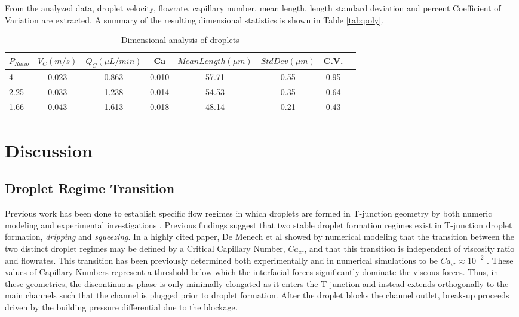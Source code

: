\clearpage

From the analyzed data, droplet velocity, flowrate, capillary number, mean length, length standard deviation and percent Coefficient of Variation are extracted. A summary of the resulting dimensional statistics is shown in Table \vref{tab:poly}.

\qquad

\begin{table}[H]
\begin{tabular}{l*{6}{c}r}
$ P_{Ratio} $ & $ V_C  (m/s) $ &  $ Q_C ( \mu  L/min) $ & Ca & $ Mean Length( \mu m )$ & $ StdDev( \mu m) $ & C.V. \\
\hline
4 & 0.023 & 0.863 & 0.010 & 57.71 & 0.55 & 0.95 \\
2.25 & 0.033 & 1.238 & 0.014 & 54.53 & 0.35 &  0.64 \\
1.66 & 0.043 & 1.613 & 0.018 & 48.14 & 0.21 &  0.43 \\
\end{tabular}
\caption[Droplet Polydispersity]{Dimensional analysis of droplets}
\label{tab:poly} 
\end{table}


\clearpage


\section{Discussion}
\subsection{Droplet Regime Transition}

Previous work has been done to establish specific flow regimes in which droplets are formed in T-junction geometry by both numeric modeling and experimental investigations \cite{Abate2012a, DeMenech2008, Garstecki2006}. Previous findings suggest that two stable droplet formation regimes exist in T-junction droplet formation, \emph{dripping} and \emph{squeezing}. In a highly cited paper, De Menech et al showed by numerical modeling that the transition between the two distinct droplet regimes may be defined by a Critical Capillary Number, $Ca_{cr}$, and that this transition is independent of viscosity ratio and flowrates. This transition has been previously determined both experimentally and in numerical simulations to be $Ca_{cr}\approx 10^{-2}$ \cite{Christopher2008, DeMenech2008, Xu2008}. These values of Capillary Numbers represent a threshold below which the interfacial forces significantly dominate the viscous forces. Thus, in these geometries, the discontinuous phase is only minimally elongated as it enters the T-junction and instead extends orthogonally to the main channels such that the channel is plugged prior to droplet formation. After the droplet blocks the channel outlet, break-up proceeds driven by the building pressure differential due to the blockage.

